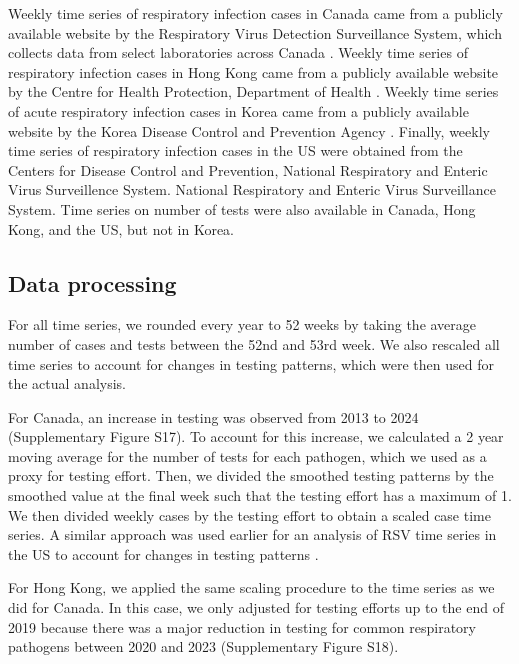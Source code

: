 \documentclass[12pt]{article}
\newcommand{\comment}{\showcomment}
\newcommand{\showcomment}[3]{\textcolor{#1}{\textbf{[#2: }\textsl{#3}\textbf{]}}}
\newcommand{\swp}[1]{\comment{magenta}{SWP}{#1}}
\begin{document}
Weekly time series of respiratory infection cases in Canada came from a publicly available website by the Respiratory Virus Detection Surveillance System, which collects data from select laboratories across Canada \citep{phac}.
Weekly time series of respiratory infection cases in Hong Kong came from a publicly available website by the Centre for Health Protection, Department of Health \citep{hkdata,hkdata2}.
Weekly time series of acute respiratory infection cases in Korea came from a publicly available website by the Korea Disease Control and Prevention Agency \citep{kordata}.
Finally, weekly time series of respiratory infection cases in the US were obtained from the Centers for Disease Control and Prevention, National Respiratory and Enteric Virus Surveillence System.
National Respiratory and Enteric Virus Surveillance System.
Time series on number of tests were also available in Canada, Hong Kong, and the US, but not in Korea.

\subsection*{Data processing}

For all time series, we rounded every year to 52 weeks by taking the average number of cases and tests between the 52nd and 53rd week.
We also rescaled all time series to account for changes in testing patterns, which were then used for the actual analysis.

For Canada, an increase in testing was observed from 2013 to 2024 (Supplementary Figure S17).
To account for this increase, we calculated a 2 year moving average for the number of tests for each pathogen, which we used as a proxy for testing effort.
Then, we divided the smoothed testing patterns by the smoothed value at the final week such that the testing effort has a maximum of 1.
We then divided weekly cases by the testing effort to obtain a scaled case time series.
A similar approach was used earlier for an analysis of RSV time series in the US to account for changes in testing patterns \citep{pitzer2015environmental}.

For Hong Kong, we applied the same scaling procedure to the time series as we did for Canada.
In this case, we only adjusted for testing efforts up to the end of 2019 because there was a major reduction in testing for common respiratory pathogens between 2020 and 2023 (Supplementary Figure S18).
\end{document}
